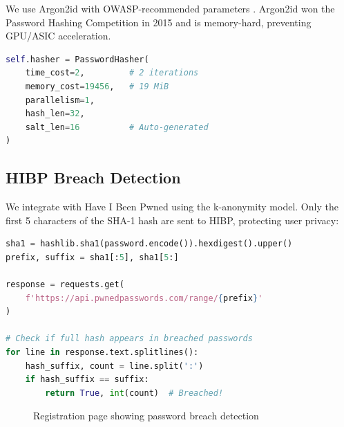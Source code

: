 \documentclass[12pt,a4paper]{article}
\begin{document}
We use Argon2id with OWASP-recommended parameters \cite{owasp_password}. Argon2id won the Password Hashing Competition in 2015 \cite{biryukov2016} and is memory-hard, preventing GPU/ASIC acceleration.

\begin{lstlisting}[language=Python]
self.hasher = PasswordHasher(
    time_cost=2,         # 2 iterations
    memory_cost=19456,   # 19 MiB
    parallelism=1,
    hash_len=32,
    salt_len=16          # Auto-generated
)
\end{lstlisting}

\subsection{HIBP Breach Detection}

We integrate with Have I Been Pwned using the k-anonymity model. Only the first 5 characters of the SHA-1 hash are sent to HIBP, protecting user privacy:

\begin{lstlisting}[language=Python]
sha1 = hashlib.sha1(password.encode()).hexdigest().upper()
prefix, suffix = sha1[:5], sha1[5:]

response = requests.get(
    f'https://api.pwnedpasswords.com/range/{prefix}'
)

# Check if full hash appears in breached passwords
for line in response.text.splitlines():
    hash_suffix, count = line.split(':')
    if hash_suffix == suffix:
        return True, int(count)  # Breached!
\end{lstlisting}

\begin{figure}[H]
    \centering
    \caption{Registration page showing password breach detection}
    \label{fig:hibp}
\end{figure}
\end{document}
